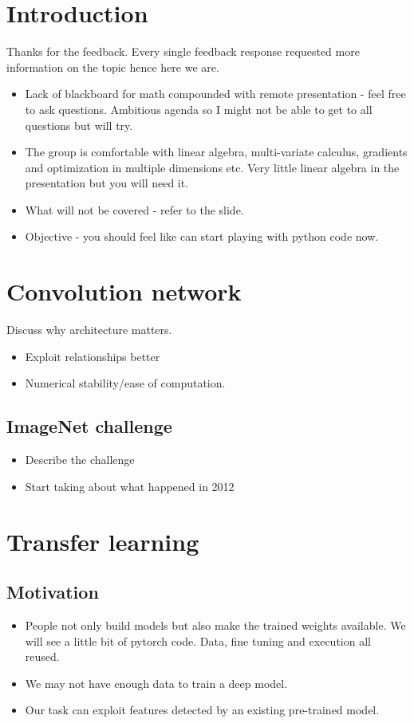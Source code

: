 \documentclass[14pt, twocolumn]{article}
\title{}
\author{}
\begin{document}
\maketitle


\section*{Introduction}
Thanks for the feedback. Every single feedback response requested more information on the topic
hence here we are.
\begin{itemize}
	\item Lack of blackboard for math compounded with remote presentation - feel free to ask 
	questions. Ambitious agenda so I might not be able to get to all questions but will try. 
	\item  The group is comfortable with linear algebra, multi-variate calculus, gradients 
	and optimization in multiple dimensions etc. Very little linear algebra in the presentation 
	but you will need it. 
	\item What will not be covered - refer to the slide. 
	\item Objective - you should feel like can start playing with python code now.
\end{itemize}

\section*{Convolution network}
Discuss why architecture matters.
\begin{itemize}
	\item Exploit relationships better 
	\item Numerical stability/ease of computation.
\end{itemize}

\subsection*{ImageNet challenge}
\begin{itemize}
	\item Describe the challenge 
	\item Start taking about what happened in 2012 
\end{itemize}


\section*{Transfer learning}
\subsection*{Motivation}
\begin{itemize}
	\item People not only build models but also make the trained weights available. 
	We will see a little bit of pytorch code. Data, fine tuning and execution all 
	reused. 
	\item We may not have enough data to train a deep model. 
	\item Our task can exploit features detected by an existing pre-trained model. 
\end{itemize}
\end{document}
